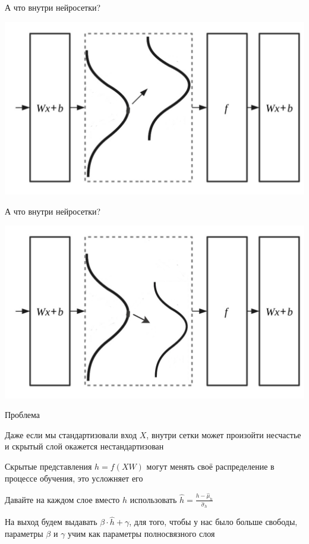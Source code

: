 \documentclass[notes,12pt, aspectratio=169]{beamer}
\newenvironment{wideitemize}{\itemize\addtolength{\itemsep}{10pt}}{\enditemize}
\begin{document}
\begin{frame}{А что внутри нейросетки?}
	\begin{center}
		\includegraphics[width=.7\linewidth]{distributions_1.png}
	\end{center}
\end{frame}


\begin{frame}{А что внутри нейросетки?}
	\begin{center}
		\includegraphics[width=.7\linewidth]{distributions_2.png}
	\end{center}
\end{frame}

\begin{frame}{Проблема}
	\begin{wideitemize}
		\item  Даже если мы стандартизовали вход $X$, внутри сетки может произойти несчастье и скрытый слой окажется нестандартизован 
		
	   \item  Скрытые представления $h = f(XW)$  могут менять своё распределение в процессе обучения, это усложняет его  
	   
	   	\item Давайте на каждом слое вместо $h$ использовать  $\hat{h} = \frac{h - \hat{\mu}_h}{\hat{\sigma}_h}$
	   	
	   	\item На выход будем выдавать $\beta \cdot  \hat h + \gamma$, для того, чтобы у нас было больше свободы, параметры $\beta$ и $\gamma$ учим как параметры полносвязного слоя
	\end{wideitemize}
\end{frame}
\end{document}
